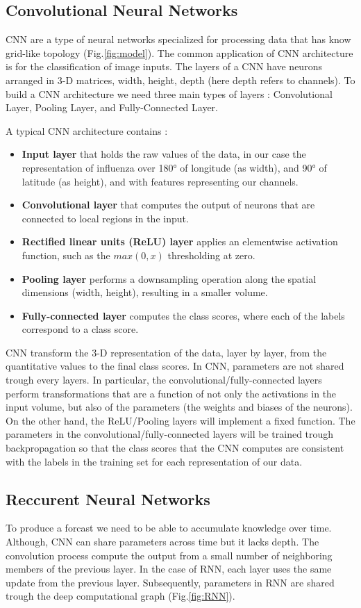 \documentclass[12pt]{article}
\begin{document}
\subsection{Convolutional Neural Networks}
CNN are a type of neural networks specialized for processing data  that has know grid-like topology (Fig.\ref{fig:model}). The common application of CNN architecture is for the classification of image inputs. The layers of a CNN have neurons arranged in 3-D matrices, width, height, depth (here depth refers to channels). To build a CNN architecture we need three main types of layers : Convolutional Layer, Pooling Layer, and Fully-Connected Layer.

A typical CNN architecture contains :
\begin{itemize}
\item \textbf{Input layer} that holds the raw values of the data, in our case the representation of influenza over 180° of longitude (as width),  and 90° of latitude (as height), and with features representing our channels.
\item \textbf{Convolutional layer} that computes the output of neurons that are connected to local regions in the input. 
\item \textbf{Rectified linear units (ReLU) layer} applies an elementwise activation function, such as the $max(0,x)$ thresholding at zero.
\item \textbf{Pooling layer} performs a downsampling operation along the spatial dimensions (width, height), resulting in a smaller volume.
\item \textbf{Fully-connected layer} computes the class scores, where each of the labels correspond to a class score.
\end{itemize}
CNN transform the 3-D representation of the data, layer by layer, from the quantitative values to the final class scores. In CNN, parameters are not shared trough every layers. In particular, the convolutional/fully-connected layers perform transformations that are a function of not only the activations in the input volume, but also of the parameters (the weights and biases of the neurons). On the other hand, the ReLU/Pooling layers will implement a fixed function. The parameters in the convolutional/fully-connected layers will be trained trough backpropagation so that the class scores that the CNN computes are consistent with the labels in the training set for each representation of our data.

\subsection{Reccurent Neural Networks}
To produce a forcast we need to be able to accumulate knowledge over time. Although, CNN can share parameters across time but it lacks depth. The convolution process compute the output from a small number of neighboring members of the previous layer. In the case of RNN, each layer uses the same update from the previous layer. Subsequently, parameters in RNN are shared trough the deep computational graph (Fig.\ref{fig:RNN}).
\end{document}
